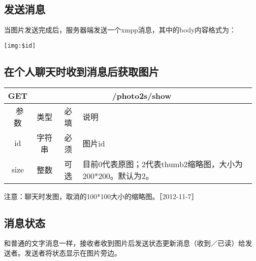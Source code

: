 \subsection{发送消息}
当图片发送完成后，服务器端发送一个xmpp消息，其中的body内容格式为：

\begin{verbatim}
[img:$id]

\end{verbatim}

\subsection{在个人聊天时收到消息后获取图片}
\begin{table}[H]
   \begin{center}
\begin{tabular}{|c|c|c|p{12cm}|}
\hline
GET & \multicolumn{3}{|c|}{/photo2s/show} \\
\hline\hline
 \  参数  & 类型 & 必填 &  说明  \\
  \hline
 id  & 字符串 & 必须 & 图片id\\
\hline
 size  & 整数 & 可选 &  目前0代表原图；2代表thumb2缩略图，大小为200*200。默认为2。\\ 
\hline
\end{tabular}
   \end{center}
\end{table}

注意：聊天时发图，取消的100*100大小的缩略图。［2012-11-7］


\subsection{消息状态}
和普通的文字消息一样，接收者收到图片后发送状态更新消息（收到／已读）给发送者。发送者将状态显示在图片旁边。

